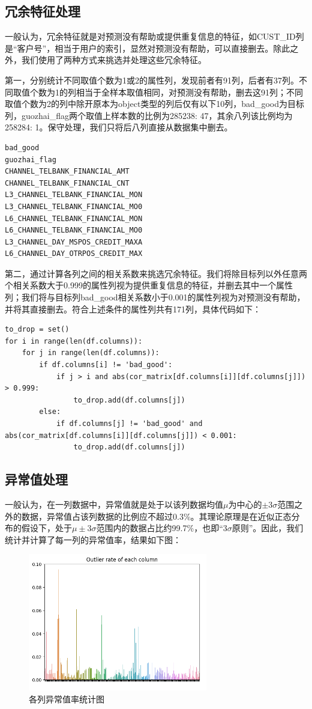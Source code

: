 \documentclass[UTF8]{article}
\begin{document}
\subsection{冗余特征处理}
一般认为，冗余特征就是对预测没有帮助或提供重复信息的特征，如CUST\_ID列是“客户号”，相当于用户的索引，显然对预测没有帮助，可以直接删去。除此之外，我们使用了两种方式来挑选并处理这些冗余特征。

第一，分别统计不同取值个数为1或2的属性列，发现前者有91列，后者有37列。不同取值个数为1的列相当于全样本取值相同，对预测没有帮助，删去这91列；不同取值个数为2的列中除开原本为object类型的列后仅有以下10列，bad\_good为目标列，guozhai\_flag两个取值上样本数的比例为285238: 47，其余八列该比例均为258284: 1。保守处理，我们只将后八列直接从数据集中删去。
\begin{lstlisting}
bad_good
guozhai_flag
CHANNEL_TELBANK_FINANCIAL_AMT
CHANNEL_TELBANK_FINANCIAL_CNT
L3_CHANNEL_TELBANK_FINANCIAL_MON
L3_CHANNEL_TELBANK_FINANCIAL_MO0
L6_CHANNEL_TELBANK_FINANCIAL_MON
L6_CHANNEL_TELBANK_FINANCIAL_MO0
L3_CHANNEL_DAY_MSPOS_CREDIT_MAXA
L6_CHANNEL_DAY_OTRPOS_CREDIT_MAX
\end{lstlisting}

第二，通过计算各列之间的相关系数来挑选冗余特征。我们将除目标列以外任意两个相关系数大于0.999的属性列视为提供重复信息的特征，并删去其中一个属性列；我们将与目标列bad\_good相关系数小于0.001的属性列视为对预测没有帮助，并将其直接删去。符合上述条件的属性列共有171列，具体代码如下：
\begin{lstlisting}
to_drop = set()
for i in range(len(df.columns)):
    for j in range(len(df.columns)):
        if df.columns[i] != 'bad_good':
            if j > i and abs(cor_matrix[df.columns[i]][df.columns[j]]) > 0.999:
                to_drop.add(df.columns[j])
        else:
            if df.columns[j] != 'bad_good' and abs(cor_matrix[df.columns[i]][df.columns[j]]) < 0.001:
                to_drop.add(df.columns[j])
\end{lstlisting}

\subsection{异常值处理}
一般认为，在一列数据中，异常值就是处于以该列数据均值$\mu$为中心的$\pm 3\sigma$范围之外的数据，异常值占该列数据的比例应不超过0.3\%。其理论原理是在近似正态分布的假设下，处于$\mu \pm 3\sigma$范围内的数据占比约99.7\%，也即“$3\sigma$原则”。因此，我们统计并计算了每一列的异常值率，结果如下图：
\begin{figure}[H]
\centering
\includegraphics[height=6cm]{../img/outlier}
\caption{各列异常值率统计图}
\end{figure}
\end{document}
